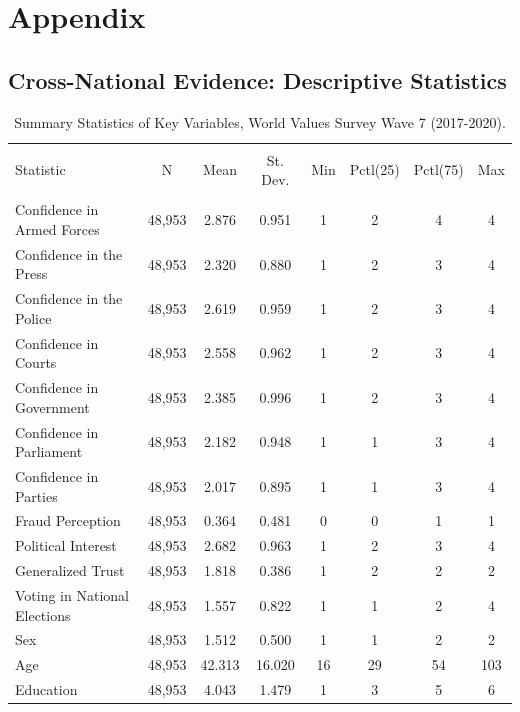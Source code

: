\documentclass[11pt, ngerman,english,a4]{article}
\begin{document}
\newpage

\section*{Appendix}

\subsection*{Cross-National Evidence: Descriptive Statistics}

\begin{table}[!htbp] \centering 
  \caption{Summary Statistics of Key Variables, World Values Survey Wave 7 (2017-2020).} 
  \label{} 
\begin{tabular}{@{\extracolsep{5pt}}lccccccc} 
\\[-1.8ex]\hline 
\hline \\[-1.8ex] 
Statistic & \multicolumn{1}{c}{N} & \multicolumn{1}{c}{Mean} & \multicolumn{1}{c}{St. Dev.} & \multicolumn{1}{c}{Min} & \multicolumn{1}{c}{Pctl(25)} & \multicolumn{1}{c}{Pctl(75)} & \multicolumn{1}{c}{Max} \\ 
\hline \\[-1.8ex] 
Confidence in Armed Forces & 48,953 & 2.876 & 0.951 & 1 & 2 & 4 & 4 \\ 
Confidence in the Press & 48,953 & 2.320 & 0.880 & 1 & 2 & 3 & 4 \\ 
Confidence in the Police & 48,953 & 2.619 & 0.959 & 1 & 2 & 3 & 4 \\ 
Confidence in Courts & 48,953 & 2.558 & 0.962 & 1 & 2 & 3 & 4 \\ 
Confidence in Government & 48,953 & 2.385 & 0.996 & 1 & 2 & 3 & 4 \\ 
Confidence in Parliament & 48,953 & 2.182 & 0.948 & 1 & 1 & 3 & 4 \\ 
Confidence in Parties & 48,953 & 2.017 & 0.895 & 1 & 1 & 3 & 4 \\ 
Fraud Perception & 48,953 & 0.364 & 0.481 & 0 & 0 & 1 & 1 \\ 
Political Interest & 48,953 & 2.682 & 0.963 & 1 & 2 & 3 & 4 \\ 
Generalized Trust & 48,953 & 1.818 & 0.386 & 1 & 2 & 2 & 2 \\ 
Voting in National Elections & 48,953 & 1.557 & 0.822 & 1 & 1 & 2 & 4 \\ 
Sex & 48,953 & 1.512 & 0.500 & 1 & 1 & 2 & 2 \\ 
Age & 48,953 & 42.313 & 16.020 & 16 & 29 & 54 & 103 \\ 
Education & 48,953 & 4.043 & 1.479 & 1 & 3 & 5 & 6 \\ 

\end{tabular}
\end{table}
\end{document}
